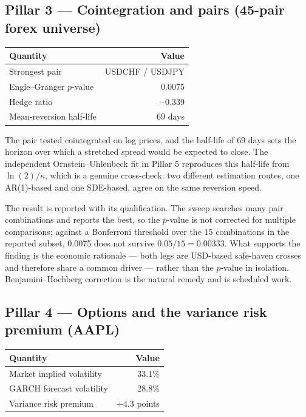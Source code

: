 \documentclass[11pt,a4paper]{article}
\begin{document}
\subsection{Pillar 3 --- Cointegration and pairs (45-pair forex universe)}

\begin{center}
\begin{tabular}{lr}
\toprule
\textbf{Quantity} & \textbf{Value} \\
\midrule
Strongest pair & USDCHF / USDJPY \\
Engle--Granger $p$-value & 0.0075 \\
Hedge ratio & $-0.339$ \\
Mean-reversion half-life & 69 days \\
\bottomrule
\end{tabular}
\end{center}

The pair tested cointegrated on log prices, and the half-life of 69 days sets the horizon
over which a stretched spread would be expected to close. The independent
Ornstein--Uhlenbeck fit in Pillar 5 reproduces this half-life from $\ln(2)/\kappa$, which
is a genuine cross-check: two different estimation routes, one AR(1)-based and one
SDE-based, agree on the same reversion speed.

The result is reported with its qualification. The sweep searches many pair combinations
and reports the best, so the $p$-value is not corrected for multiple comparisons; against a
Bonferroni threshold over the 15 combinations in the reported subset, 0.0075 does not
survive $0.05/15 = 0.00333$. What supports the finding is the economic rationale --- both
legs are USD-based safe-haven crosses and therefore share a common driver --- rather than
the $p$-value in isolation. Benjamini--Hochberg correction is the natural remedy and is
scheduled work.

\subsection{Pillar 4 --- Options and the variance risk premium (AAPL)}

\begin{center}
\begin{tabular}{lr}
\toprule
\textbf{Quantity} & \textbf{Value} \\
\midrule
Market implied volatility & 33.1\% \\
GARCH forecast volatility & 28.8\% \\
Variance risk premium & $+4.3$ points \\
\bottomrule
\end{tabular}
\end{center}
\end{document}
